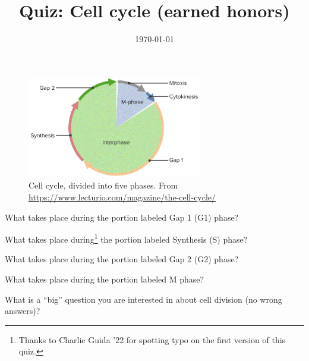 \documentclass[quiz,addpoints,noanswers]{exam}
\title{Quiz: Cell cycle (earned honors)}
\date{\today}
\author{\mobeardInstructorShort}
\begin{document}
\maketitle

\begin{figure}[h]
\begin{center}
\includegraphics[width=3in]{cellcycle.png}
\end{center}
\caption{Cell cycle, divided into five phases. From \url{https://www.lecturio.com/magazine/the-cell-cycle/}}
\end{figure}

\begin{questions}
\question[1] What takes place during the portion labeled Gap 1 (G1) phase? 
\begin{solution}[1.25in]
\end{solution}

\question[1] What takes place during\footnote{Thanks to Charlie Guida '22 for spotting typo on the first version of this quiz.} the portion labeled Synthesis (S) phase?
\begin{solution}[1.25in]
\end{solution}

\question[1] What takes place during the portion labeled Gap 2 (G2) phase? 
\begin{solution}
\end{solution}

\clearpage
\question[1] What takes place during the portion labeled M phase? 
\begin{solution}[1.5in]
\end{solution}

\question[1]  What is a ``big'' question you are interested in about cell division (no wrong answers)? 
\begin{solution}[1in]
\end{solution}

\end{questions}
\end{document}
